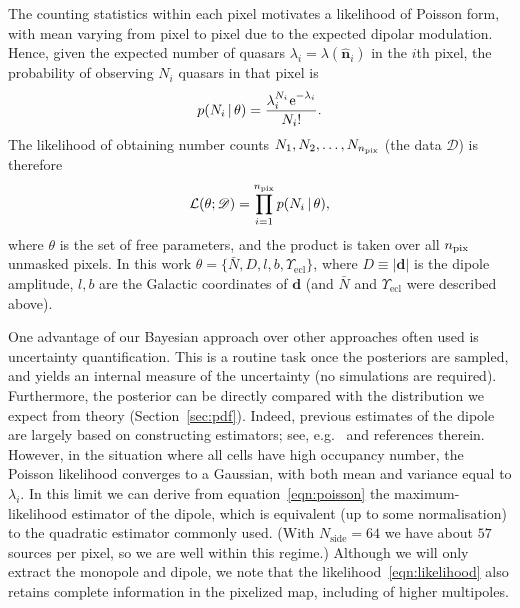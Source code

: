 \documentclass[fleqn,usenatbib]{mnras}
\def\Zu#1{^{\lower-1pt\hbox{$\scriptstyle#1$}}}
\def\sp{\hspace{0.06em}}
\def\mbf#1{\mathbf{#1}}
\def\mrm#1{\mathrm{#1}}
\def\rme{\mathrm{e}}
\def\mid{\,|\,}
\def\npix{{n_{\rm pix}}}
\def\n{\hat{\mathbf{n}}}
\begin{document}
The counting statistics within
each pixel motivates a likelihood of Poisson form, with
mean varying from pixel to pixel due to the expected dipolar
modulation.
Hence, given the expected
number of quasars $\lambda_i=\lambda(\n_i)$ in the $i$th pixel, the probability of observing $N_i$ quasars
in that pixel is
\begin{equation}
    p(N_i\mid\theta) = \frac{\lambda_i\Zu{N_i}\sp \rme\Zu{-\lambda_i}}{N_i !}.
    \label{eqn:poisson}
\end{equation}
The likelihood of obtaining number counts $N_1,N_2,\ldots,N_\npix$ (the data $\mathscr{D}$)
is therefore
\begin{equation}
    \mathcal{L}(\theta;\mathscr{D})
        = \prod_{i=1}^{\npix} p(N_i\mid\theta),
    \label{eqn:likelihood}
\end{equation}
where $\theta$ is the set of free parameters, and the product
is taken over all $\npix$ unmasked pixels.
In this work $\theta=\{\bar{N},D,l,b,\Upsilon_\mrm{ecl}\}$, where $D\equiv|\mbf{d}|$ is the
dipole amplitude, $l,b$ are the Galactic coordinates of $\mbf{d}$ (and $\bar{N}$ and $\Upsilon_\mrm{ecl}$ were described above).

One advantage of our Bayesian approach over
other approaches often used is uncertainty quantification. This is a routine task once the posteriors are sampled, and yields an internal measure of the uncertainty (no simulations are required). Furthermore, the posterior can be directly
compared with the distribution we expect from theory
(Section~\ref{sec:pdf}).
Indeed, previous estimates of the dipole are largely based on constructing estimators; see, e.g.~\citet{2021A&A...653A...9S} and references
therein.
However, in the situation where all cells have high occupancy number, the 
Poisson likelihood converges to a Gaussian, with both mean and variance equal to $\lambda_i$. In this limit we can derive from equation~\eqref{eqn:poisson} the maximum-likelihood estimator
of the dipole, which is
equivalent (up to some normalisation) 
to the quadratic estimator commonly used.
(With $N_\mrm{side}=64$ we have about $57$ sources per pixel, so we
are well within this regime.)
Although we will only extract the monopole and dipole, we note
that the likelihood~\eqref{eqn:likelihood} also retains complete information in the pixelized map, including of higher multipoles.
\end{document}
